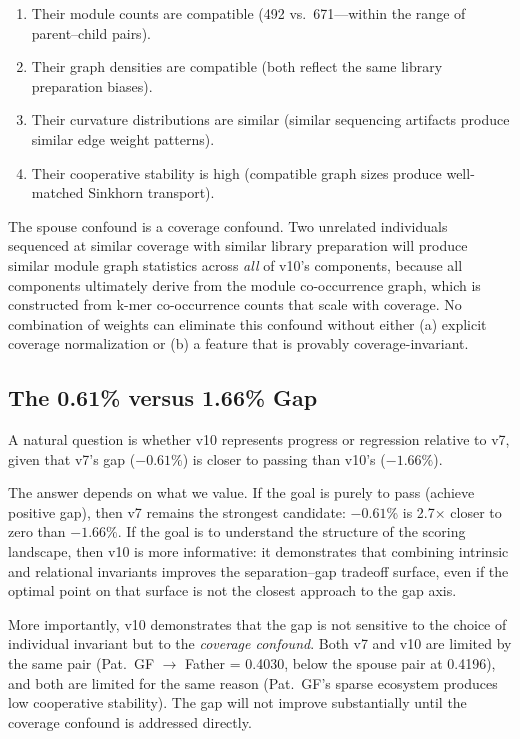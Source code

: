 \documentclass{../yalumba}
\begin{document}
\begin{enumerate}
\item Their module counts are compatible (492 vs.\ 671---within
  the range of parent--child pairs).
\item Their graph densities are compatible (both reflect the same
  library preparation biases).
\item Their curvature distributions are similar (similar sequencing
  artifacts produce similar edge weight patterns).
\item Their cooperative stability is high (compatible graph sizes
  produce well-matched Sinkhorn transport).
\end{enumerate}

\begin{limitation}
The spouse confound is a coverage confound.  Two unrelated individuals
sequenced at similar coverage with similar library preparation will
produce similar module graph statistics across \emph{all} of v10's
components, because all components ultimately derive from the module
co-occurrence graph, which is constructed from k-mer co-occurrence
counts that scale with coverage.  No combination of weights can
eliminate this confound without either (a) explicit coverage
normalization or (b) a feature that is provably coverage-invariant.
\end{limitation}

\subsection{The 0.61\% versus 1.66\% Gap}

A natural question is whether v10 represents progress or regression
relative to v7, given that v7's gap ($-0.61\%$) is closer to passing
than v10's ($-1.66\%$).

The answer depends on what we value.  If the goal is purely to pass
(achieve positive gap), then v7 remains the strongest candidate:
$-0.61\%$ is 2.7$\times$ closer to zero than $-1.66\%$.  If the
goal is to understand the structure of the scoring landscape, then v10
is more informative: it demonstrates that combining intrinsic and
relational invariants improves the separation--gap tradeoff surface,
even if the optimal point on that surface is not the closest approach
to the gap axis.

More importantly, v10 demonstrates that the gap is not sensitive
to the choice of individual invariant but to the \emph{coverage
confound}.  Both v7 and v10 are limited by the same pair
(Pat.~GF $\to$ Father = 0.4030, below the spouse pair at 0.4196),
and both are limited for the same reason (Pat.~GF's sparse ecosystem
produces low cooperative stability).  The gap will not improve
substantially until the coverage confound is addressed directly.
\end{document}
